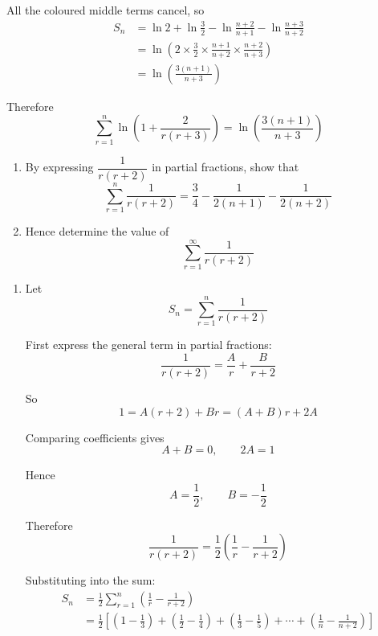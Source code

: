 \documentclass[leqno]{article}
\begin{document}
\begin{enumerate}[
  label=\textbf{\arabic*.},
  leftmargin=*,
  topsep=0pt,
  partopsep=0pt,
  parsep=0pt
]
\begin{djsSolution}
\begin{enumerate}[label=\textbf{(\alph*)}]
All the coloured middle terms cancel, so
\begin{align*}
S_n
&=\ln2+\ln\frac32-\ln\frac{n+2}{n+1}-\ln\frac{n+3}{n+2} \\
&=\ln\left(2\times\frac32\times\frac{n+1}{n+2}\times\frac{n+2}{n+3}\right) \\
&=\ln\left(\frac{3(n+1)}{n+3}\right)
\end{align*}

Therefore
\[
\sum_{r=1}^{n}\ln\left(1+\frac{2}{r(r+3)}\right)=\ln\left(\frac{3(n+1)}{n+3}\right)
\]
\end{enumerate}
\end{djsSolution}


\newpage

\questionitem

\begin{enumerate}[label=\textbf{(\alph*)}]
  \item By expressing $\dfrac{1}{r(r+2)}$ in partial fractions, show that
  \[
  \sum_{r=1}^{n} \frac{1}{r(r+2)} = \frac{3}{4} - \frac{1}{2(n+1)} - \frac{1}{2(n+2)}
  \]
  \item Hence determine the value of
  \[
  \sum_{r=1}^{\infty} \frac{1}{r(r+2)}
  \]
\end{enumerate}

\vspace*{10pt}

\begin{djsSolution}
\begin{enumerate}[label=\textbf{(\alph*)}]
  \item Let
  \[
  S_n=\sum_{r=1}^{n}\frac{1}{r(r+2)}
  \]

  First express the general term in partial fractions:
  \[
  \frac{1}{r(r+2)}=\frac{A}{r}+\frac{B}{r+2}
  \]

  So
  \[
  1=A(r+2)+Br=(A+B)r+2A
  \]

  Comparing coefficients gives
  \[
  A+B=0,\qquad 2A=1
  \]

  Hence
  \[
  A=\frac12,\qquad B=-\frac12
  \]

  Therefore
  \[
  \frac{1}{r(r+2)}=\frac12\left(\frac1r-\frac1{r+2}\right)
  \]

  Substituting into the sum:
  \begin{align*}
  S_n
  &=\frac12\sum_{r=1}^{n}\left(\frac1r-\frac1{r+2}\right)\\
  &=\frac12\left[\left(1-\frac13\right)+\left(\frac12-\frac14\right)+\left(\frac13-\frac15\right)+\cdots+\left(\frac1n-\frac1{n+2}\right)\right]
  \end{align*}


\end{enumerate}
\end{djsSolution}
\end{enumerate}
\end{document}

